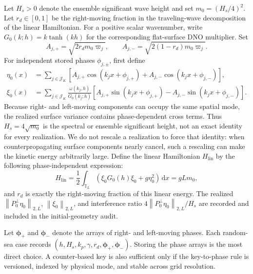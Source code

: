 \documentclass[11pt]{article}
\newcommand{\T}{\mathbb T}
\newcommand{\dd}{\,\mathrm d}
\newcommand{\norm}[1]{\left\lVert #1\right\rVert}
\begin{document}
Let $H_s>0$ denote the ensemble significant wave height and set
$m_0=(H_s/4)^2$.
Let $r_d\in[0,1]$ be the right-moving fraction in the traveling-wave
decomposition of the linear Hamiltonian.
For a positive scalar wavenumber, write
$G_0(k;h)=k\tanh(kh)$ for the corresponding flat-surface DNO multiplier.
Set
\begin{equation}
  A_{j,+}=\sqrt{2r_dm_0\varpi_j},\qquad
  A_{j,-}=\sqrt{2(1-r_d)m_0\varpi_j}.
  \label{eq:jonswap-amplitudes}
\end{equation}
For independent stored phases $\phi_{j,\pm}$, first define
\begin{align}
  \eta_0(x)
  &=\sum_{j\in\mathcal J_K}\left[
    A_{j,+}\cos(k_jx+\phi_{j,+})
    +A_{j,-}\cos(k_jx+\phi_{j,-})
  \right],
  \label{eq:jonswap-eta}\\
  \xi_0(x)
  &=\sum_{j\in\mathcal J_K}\frac{\omega(k_j,h)}{G_0(k_j;h)}
  \left[
    A_{j,+}\sin(k_jx+\phi_{j,+})
    -A_{j,-}\sin(k_jx+\phi_{j,-})
  \right].
  \label{eq:jonswap-xi}
\end{align}
Because right- and left-moving components can occupy the same spatial mode,
the realized surface variance
contains phase-dependent cross terms.  Thus $H_s=4\sqrt{m_0}$ is the spectral
or ensemble significant height, not an exact identity for every realization.
We do not rescale a realization to force that identity: when counterpropagating
surface components nearly cancel, such a rescaling can make the kinetic
energy arbitrarily large.  Define the linear Hamiltonian $H_{\mathrm{lin}}$
by the following phase-independent expression:
\begin{equation}
  H_{\mathrm{lin}}
  =\frac12\int_{\T_L}
    \left(\xi_0G_0(h)\xi_0+g\eta_0^2\right)\dd x
  =gLm_0,
  \label{eq:jonswap-linear-energy}
\end{equation}
and $r_d$ is exactly the right-moving fraction of this linear energy.
The realized $\norm{P_0^\perp\eta_0}_{2,L}$,
$\norm{\xi_0}_{2,L}$, and interference ratio
$4\norm{P_0^\perp\eta_0}_{2,L}/H_s$ are recorded and included in the
initial-geometry audit.

Let $\bm\phi_+$ and $\bm\phi_-$ denote the arrays of right- and left-moving
phases.  Each random-sea case records
$(h,H_s,k_p,\gamma,r_d,\bm\phi_+,\bm\phi_-)$.
Storing the phase arrays is the most direct choice.  A counter-based key is
also sufficient only if the key-to-phase rule is versioned, indexed by
physical mode, and stable across grid resolution.
\end{document}
